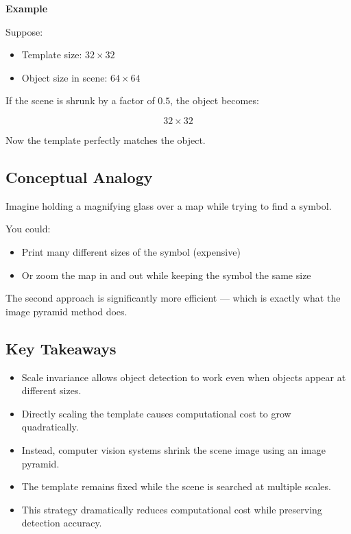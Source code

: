 \documentclass[12pt]{article}
\begin{document}
\textbf{Example}

Suppose:

\begin{itemize}
    \item Template size: $32 \times 32$
    \item Object size in scene: $64 \times 64$
\end{itemize}

If the scene is shrunk by a factor of $0.5$, the object becomes:

\[
    32 \times 32
\]

Now the template perfectly matches the object.

\subsection{Conceptual Analogy}

Imagine holding a magnifying glass over a map while trying to find a symbol.

You could:

\begin{itemize}
    \item Print many different sizes of the symbol (expensive)
    \item Or zoom the map in and out while keeping the symbol the same size
\end{itemize}

The second approach is significantly more efficient — which is exactly what the image pyramid method does.

\subsection{Key Takeaways}

\begin{itemize}

    \item Scale invariance allows object detection to work even when objects appear at different sizes.

    \item Directly scaling the template causes computational cost to grow quadratically.

    \item Instead, computer vision systems shrink the scene image using an image pyramid.

    \item The template remains fixed while the scene is searched at multiple scales.

    \item This strategy dramatically reduces computational cost while preserving detection accuracy.

\end{itemize}
\end{document}
